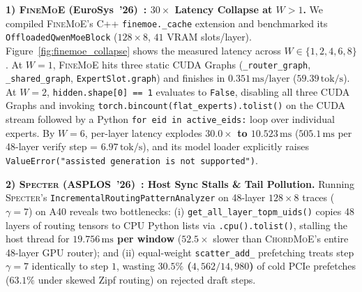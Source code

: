 \documentclass[10pt,twocolumn]{article}
\theoremstyle{definition}
\begin{document}
\vspace{2pt}
\noindent\textbf{1) \textsc{FineMoE} (EuroSys~'26)~\cite{finemoe2026}: $30\times$ Latency Collapse at $W > 1$.}
We compiled \textsc{FineMoE}'s C++ \texttt{finemoe.\_cache} extension and benchmarked its \texttt{OffloadedQwenMoeBlock} ($128\times 8$, $41$ VRAM slots/layer). Figure~\ref{fig:finemoe_collapse} shows the measured latency across $W \in \{1,2,4,6,8\}$. At $W=1$, \textsc{FineMoE} hits three static CUDA Graphs (\texttt{\_router\_graph}, \texttt{\_shared\_graph}, \texttt{ExpertSlot.graph}) and finishes in $0.351\,\text{ms/layer}$ ($59.39\,\text{tok/s}$). At $W=2$, \texttt{hidden.shape[0] == 1} evaluates to \texttt{False}, disabling all three CUDA Graphs and invoking \texttt{torch.bincount(flat\_experts).tolist()} on the CUDA stream followed by a Python \texttt{for eid in active\_eids:} loop over individual experts. By $W=6$, per-layer latency explodes \textbf{$30.0\times$ to $10.523\,\text{ms}$} ($505.1\,\text{ms}$ per 48-layer verify step = $6.97\,\text{tok/s}$), and its model loader explicitly raises \texttt{ValueError("assisted generation is not supported")}.

\vspace{2pt}
\noindent\textbf{2) \textsc{Specter} (ASPLOS~'26)~\cite{specter2026}: Host Sync Stalls \& Tail Pollution.}
Running \textsc{Specter}'s \texttt{IncrementalRoutingPatternAnalyzer} on 48-layer $128\times 8$ traces ($\gamma = 7$) on A40 reveals two bottlenecks: (i) \texttt{get\_all\_layer\_topm\_uids()} copies 48 layers of routing tensors to CPU Python lists via \texttt{.cpu().tolist()}, stalling the host thread for \textbf{$19.756\,\text{ms}$ per window} ($52.5\times$ slower than \textsc{ChordMoE}'s entire 48-layer GPU router); and (ii) equal-weight \texttt{scatter\_add\_} prefetching treats step $\gamma=7$ identically to step $1$, wasting \textbf{$30.5\%$ ($4,562/14,980$)} of cold PCIe prefetches ($63.1\%$ under skewed Zipf routing) on rejected draft steps.
\end{document}
